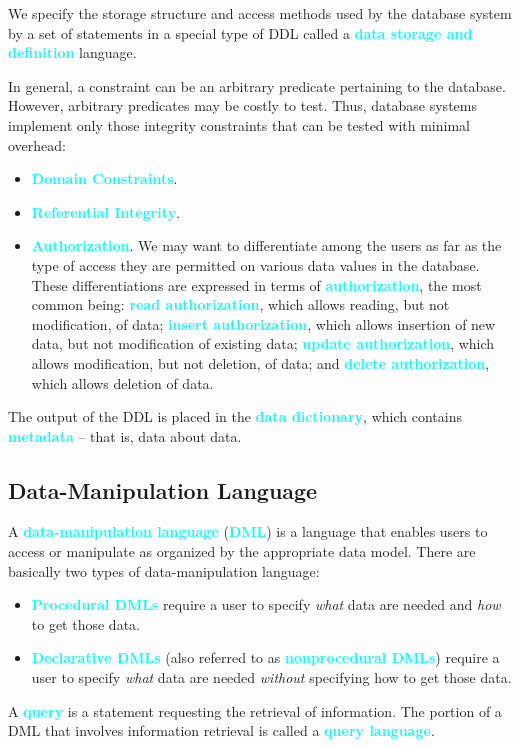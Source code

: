 \documentclass[a4paper,12pt,twoside,openany]{book}
\newcommand{\textcy}[1]{\textbf{\textcolor{cyan}{#1}}}
\begin{document}
We specify the storage structure and access methods used by the database system by a set of statements in a special type of DDL called a \textcy{data storage and definition} language.

In general, a constraint can be an arbitrary predicate pertaining to the database. However, arbitrary predicates may be costly to test. Thus, database systems implement only those integrity constraints that can be tested with minimal overhead:
\begin{itemize}
    \item\textcy{Domain Constraints}.
    \item\textcy{Referential Integrity}.
    \item\textcy{Authorization}. We may want to differentiate among the users as far as the type of access they are permitted on various data values in the database. These differentiations are expressed in terms of \textcy{authorization}, the most common being: \textcy{read authorization}, which allows reading, but not modification, of data; \textcy{insert authorization}, which allows insertion of new data, but not modification of existing data; \textcy{update authorization}, which allows modification, but not deletion, of data; and \textcy{delete authorization}, which allows deletion of data.
\end{itemize}

The output of the DDL is placed in the \textcy{data dictionary}, which contains \textcy{metadata} -- that is, data about data.

\subsection{Data-Manipulation Language}

A \textcy{data-manipulation language} (\textcy{DML}) is a language that enables users to access or manipulate as organized by the appropriate data model. There are basically two types of data-manipulation language:
\begin{itemize}
    \item\textcy{Procedural DMLs} require a user to specify \textit{what} data are needed and \textit{how} to get those data.
    \item\textcy{Declarative DMLs} (also referred to as \textcy{nonprocedural DMLs}) require a user to specify \textit{what} data are needed \textit{without} specifying how to get those data.
\end{itemize}

A \textcy{query} is a statement requesting the retrieval of information. The portion of a DML that involves information retrieval is called a \textcy{query language}.
\end{document}
